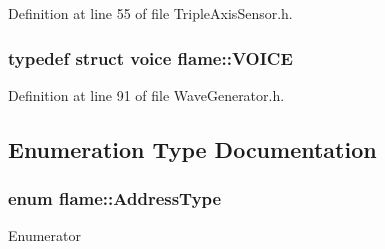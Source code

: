 Definition at line 55 of file Triple\-Axis\-Sensor.\-h.

\hypertarget{namespaceflame_a69cbce86034387173caf0aaf772a5d3b}{
\subsubsection[{V\-O\-I\-C\-E}]{\setlength{\rightskip}{0pt plus 5cm}typedef struct {\bf voice} {\bf flame\-::\-V\-O\-I\-C\-E}}}\label{namespaceflame_a69cbce86034387173caf0aaf772a5d3b}


Definition at line 91 of file Wave\-Generator.\-h.



\subsection{Enumeration Type Documentation}
\hypertarget{namespaceflame_a62698923ce7cbb06514750e7f0651c7f}{
\subsubsection[{Address\-Type}]{\setlength{\rightskip}{0pt plus 5cm}enum {\bf flame\-::\-Address\-Type}\hspace{0.3cm}{\ttfamily [strong]}}}\label{namespaceflame_a62698923ce7cbb06514750e7f0651c7f}
\begin{Desc}
\item[Enumerator]\par
\begin{description}
\item[{\em 
\hypertarget{namespaceflame_a62698923ce7cbb06514750e7f0651c7fa1e23852820b9154316c7c06e2b7ba051}{N\-O\-R\-M\-A\-L}\label{namespaceflame_a62698923ce7cbb06514750e7f0651c7fa1e23852820b9154316c7c06e2b7ba051}
}]\item[{\em 
\hypertarget{namespaceflame_a62698923ce7cbb06514750e7f0651c7fab65ac8cee0e0726efd689707838b2143}{P\-R\-O\-G\-\_\-\-M\-E\-M}\label{namespaceflame_a62698923ce7cbb06514750e7f0651c7fab65ac8cee0e0726efd689707838b2143}
}]\end{description}
\end{Desc}


